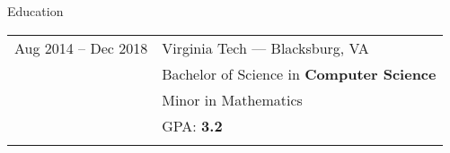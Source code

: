 \documentclass{resume} %
\begin{document}

\begin{rSection}{Education}
\begin{tabular}{r|p{13cm}}

Aug 2014 -- Dec 2018 & Virginia Tech --- Blacksburg, VA\\
& Bachelor of Science in \textbf{Computer Science} \\
& Minor in Mathematics \\
& GPA: \textbf{3.2} \\ 
\multicolumn{2}{c}{} 
\end{tabular}
\end{rSection}
\end{document}
